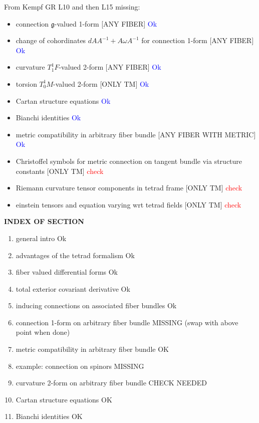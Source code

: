 \newpage
\bigskip
{
From Kempf GR L10 and then L15 missing:
\begin{itemize}
    \item connection $\mathfrak{g}$-valued 1-form [ANY FIBER] \textcolor{blue}{Ok}
    \item change of cohordinates $dA A^{-1}+ A\omega A^{-1}$ for connection 1-form [ANY FIBER] \textcolor{blue}{Ok}
    \item curvature $T^1_1F$-valued 2-form [ANY FIBER] \textcolor{blue}{Ok}
    \item torsion $T^1_0M$-valued 2-form [ONLY TM] \textcolor{blue}{Ok}
    \item Cartan structure equations \textcolor{blue}{Ok}
    \item Bianchi identities \textcolor{blue}{Ok}
    \item metric compatibility in arbitrary fiber bundle [ANY FIBER WITH METRIC] \textcolor{blue}{Ok}
    \item Christoffel symbols for metric connection on tangent bundle via structure constants [ONLY TM] \textcolor{red}{check}
    \item Riemann curvature tensor components in tetrad frame [ONLY TM] \textcolor{red}{check}
    \item einstein tensors and equation varying wrt tetrad fields [ONLY TM] \textcolor{red}{check}
\end{itemize}
}
\bigskip

\noindent
\textbf{INDEX OF SECTION}
\begin{enumerate}
    \item general intro Ok
    \item advantages of the tetrad formalism Ok
    \item fiber valued differential forms Ok
    \item total exterior covariant derivative Ok
    \item inducing connections on associated fiber bundles Ok
    \item connection 1-form on arbitrary fiber bundle  {\color{red}MISSING (swap with above point when done)}
    \item metric compatibility in arbitrary fiber bundle OK
    \item example: connection on spinors {\color{red}MISSING}
    \item curvature 2-form on arbitrary fiber bundle {\color{red} CHECK NEEDED}
    \item Cartan structure equations OK
    \item Bianchi identities OK
\end{enumerate}


